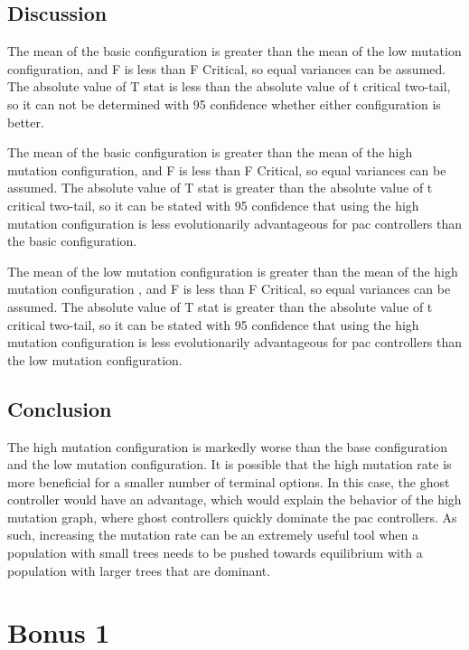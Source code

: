 \documentclass{article}
\newcommand\tab[1][1cm]{\hspace*{#1}}
\begin{document}
\subsection{Discussion}
\begin{flushleft}
\tab
The mean of the basic configuration is greater than the mean of the low mutation
 configuration, and F is less than F Critical,
 so equal variances can be assumed. The absolute value of T stat is less than the
 absolute value of t critical two-tail, so it can not be determined with 95%
 confidence whether either configuration is better.

\tab
The mean of the basic configuration is greater than the mean of the high
 mutation configuration, and F is less than F Critical,
 so equal variances can be assumed. The absolute value of T stat is greater
 than the absolute value of t critical two-tail, so it can be stated with 95%
 confidence that using the high mutation configuration is less evolutionarily
 advantageous for pac controllers than the basic configuration.

\tab
The mean of the low mutation configuration is greater than the mean of the high
 mutation configuration , and F is less than F Critical,
 so equal variances can be assumed. The absolute value of T stat is greater
 than the absolute value of t critical two-tail, so it can be stated with 95%
 confidence that using the high mutation configuration is less evolutionarily
 advantageous for pac controllers than the low mutation configuration.
\end{flushleft}


\subsection{Conclusion}
\begin{flushleft}
The high mutation configuration is markedly worse than the base configuration
 and the low mutation configuration. It is possible that the high mutation rate
 is more beneficial for a smaller number of terminal options. In this case, the
 ghost controller would have an advantage, which would explain the behavior of
 the high mutation graph, where ghost controllers quickly dominate the pac
 controllers. As such, increasing the mutation rate can be an extremely useful
 tool when a population with small trees needs to be pushed towards equilibrium
 with a population with larger trees that are dominant.
\end{flushleft}

\clearpage
\section{Bonus 1}
\end{document}
